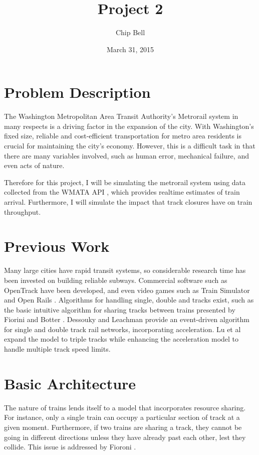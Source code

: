 \documentclass[a4paper,12pt]{article}
\begin{document}
\title{Project 2}
\author{Chip Bell}
\date{March 31, 2015}
\maketitle

\section{Problem Description}
The Washington Metropolitan Area Transit Authority's Metrorail system in many respects is a driving factor in the
expansion of the city. With Washington's fixed size, reliable and cost-efficient transportation for metro area
residents is crucial for maintaining the city's economy. However, this is a difficult task in that there are many
variables involved, such as human error, mechanical failure, and even acts of nature.

Therefore for this project, I will be simulating the metrorail system using data collected from the WMATA API
\cite{wmataapi}, which provides realtime estimates of train arrival. Furthermore, I will simulate the impact that track
closures have on train throughput.

\section{Previous Work}
Many large cities have rapid transit systems, so considerable research time has been invested on building reliable
subways. Commercial software such as OpenTrack \cite{opentrack} have been developed, and even video games such as Train
Simulator \cite{trainsimulator} and Open Rails \cite{openrails}. Algorithms for handling single, double and tracks exist, such as the basic intuitive
algorithm for sharing tracks between trains presented by Fiorini and Botter \cite{fioroni}. Dessouky and Leachman
\cite{dessouky_leachman_95} provide an event-driven algorithm for single and double track rail networks, incorporating
acceleration. Lu et al \cite{quan_lu} expand the model to triple tracks while enhancing the acceleration model to
handle multiple track speed limits.

\section{Basic Architecture}
The nature of trains lends itself to a model that incorporates resource sharing. For instance, only a single train can
occupy a particular section of track at a given moment. Furthermore, if two trains are sharing a track, they cannot
be going in different directions unless they have already past each other, lest they collide. This issue is addressed
by Fioroni \cite{fioroni}.
\end{document}
